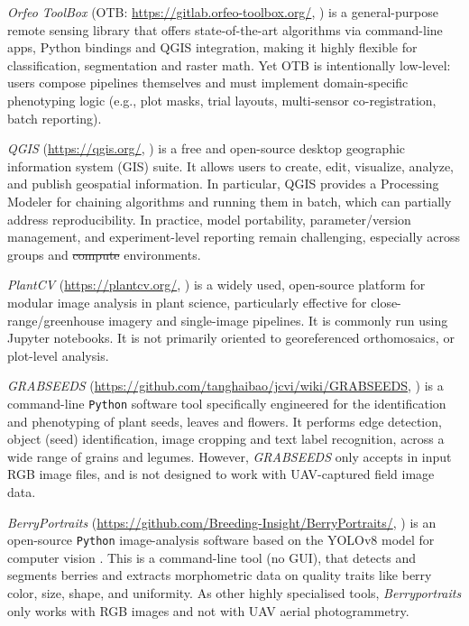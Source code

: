 \documentclass[drones,technicalnote,accept,pdftex,moreauthors]{Definitions/mdpi}
\providecommand{\DIFadd}[1]{{\protect\color{blue}\uwave{#1}}} %
\providecommand{\DIFdel}[1]{{\protect\color{red}\sout{#1}}}                      %
\providecommand{\DIFaddbegin}{} %
\providecommand{\DIFaddend}{} %
\providecommand{\DIFdelbegin}{} %
\providecommand{\DIFdelend}{} %
\newcommand{\DIFscaledelfig}{0.5}
\newlength{\DIFdelgraphicswidth} %
\newlength{\DIFdelgraphicsheight} %
\newcommand{\DIFaddincludegraphics}[2][]{{\color{blue}\fbox{\DIFOincludegraphics[#1]{#2}}}} %
\newcommand{\DIFdelincludegraphics}[2][]{%
\sbox{\DIFdelgraphicsbox}{\DIFOincludegraphics[#1]{#2}}%
\settoboxwidth{\DIFdelgraphicswidth}{\DIFdelgraphicsbox} %
\settoboxtotalheight{\DIFdelgraphicsheight}{\DIFdelgraphicsbox} %
\scalebox{\DIFscaledelfig}{%
\parbox[b]{\DIFdelgraphicswidth}{\usebox{\DIFdelgraphicsbox}\\[-\baselineskip] \rule{\DIFdelgraphicswidth}{0em}}\llap{\resizebox{\DIFdelgraphicswidth}{\DIFdelgraphicsheight}{%
\setlength{\unitlength}{\DIFdelgraphicswidth}%
\begin{picture}(1,1)%
\thicklines\linethickness{2pt} %
{\color[rgb]{1,0,0}\put(0,0){\framebox(1,1){}}}%
{\color[rgb]{1,0,0}\put(0,0){\line( 1,1){1}}}%
{\color[rgb]{1,0,0}\put(0,1){\line(1,-1){1}}}%
\end{picture}%
}\hspace*{3pt}}} %
} %
\DeclareRobustCommand{\DIFaddbegin}{\DIFOaddbegin \let\includegraphics\DIFaddincludegraphics} %
\DeclareRobustCommand{\DIFaddend}{\DIFOaddend \let\includegraphics\DIFOincludegraphics} %
\DeclareRobustCommand{\DIFdelbegin}{\DIFOdelbegin \let\includegraphics\DIFdelincludegraphics} %
\DeclareRobustCommand{\DIFdelend}{\DIFOaddend \let\includegraphics\DIFOincludegraphics} %
\begin{document}
\textit{Orfeo ToolBox} (OTB: \url{https://gitlab.orfeo-toolbox.org/}, \cite{noauthor_orfeo_nodate, grizonnet_orfeo_2017}) is a general-purpose remote sensing library that offers state-of-the-art algorithms via command-line apps, Python bindings and QGIS integration, making it highly flexible for classification, segmentation and raster math. Yet OTB is intentionally low-level: users compose pipelines themselves and must implement domain-specific phenotyping logic (e.g., plot masks, trial layouts, multi-sensor co-registration, batch reporting). 

\textit{QGIS} (\url{https://qgis.org/}, \cite{moyroud2018introduction}) is a free and open-source desktop geographic information system (GIS) suite. It allows users to create, edit, visualize, analyze, and publish geospatial information. In particular, QGIS provides a Processing Modeler \cite{dobesova2020evaluation} for chaining algorithms and running them in batch, which can partially address reproducibility. In practice, model portability, parameter/version management, and experiment-level reporting remain challenging, especially across groups and \DIFdelbegin \DIFdel{compute }\DIFdelend \DIFaddbegin \DIFadd{computer }\DIFaddend environments.

\textit{PlantCV} (\url{https://plantcv.org/}, \cite{noauthor_plantcv_2021}) is a widely used, open-source platform for modular image analysis in plant science, particularly effective for close-range/greenhouse imagery and single-image pipelines. It is commonly run using Jupyter notebooks. It is not primarily oriented to georeferenced orthomosaics,  or plot-level analysis.

\textit{GRABSEEDS} (\url{https://github.com/tanghaibao/jcvi/wiki/GRABSEEDS}, \cite{tang2024grabseeds}) is a command-line \texttt{Python} software tool specifically engineered for the identification and phenotyping of plant seeds, leaves and flowers.
It performs edge detection, object (seed) identification, image cropping and text label recognition, across a wide range of grains and legumes.
However, \textit{GRABSEEDS} only accepts in input RGB image files, and is not designed to work with UAV-captured field image data.

\textit{BerryPortraits} (\url{https://github.com/Breeding-Insight/BerryPortraits/}, \cite{loarca2024berryportraits}) is an open-source \texttt{Python} image-analysis software based on the YOLOv8 model for computer vision \cite{varghese2024yolov8}. 
This is a command-line tool (no GUI), that detects and segments berries and extracts morphometric data on quality traits like berry color, size, shape, and uniformity. 
As other highly specialised tools, \textit{Berryportraits} only works with RGB images and not with UAV aerial photogrammetry.
\end{document}
